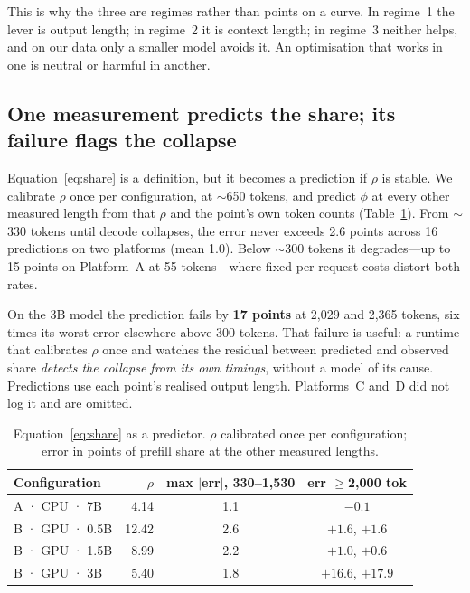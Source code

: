 \documentclass[sigconf,nonacm,10pt]{acmart}
\begin{document}
This is why the three are regimes rather than points on a curve. In regime~1 the lever is output length; in
regime~2 it is context length; in regime~3 neither helps, and on our data only a smaller model avoids it. An
optimisation that works in one is neutral or harmful in another.

\subsection{One measurement predicts the share; its failure flags the collapse}
\label{sec:predict}

Equation~\ref{eq:share} is a definition, but it becomes a prediction if $\rho$ is stable. We calibrate $\rho$
once per configuration, at $\sim$650 tokens, and predict $\phi$ at every other measured length from that $\rho$
and the point's own token counts (Table~\ref{tab:predict}). From $\sim$330 tokens until decode collapses, the error
never exceeds 2.6 points across 16 predictions on two platforms (mean 1.0). Below $\sim$300 tokens it degrades---up to 15 points on
Platform~A at 55 tokens---where fixed per-request costs distort both rates.

On the 3B model the prediction fails by \textbf{17 points} at 2{,}029 and 2{,}365 tokens, six times its worst error
elsewhere above 300 tokens. That failure is useful: a runtime that calibrates $\rho$ once and watches the residual between
predicted and observed share \emph{detects the collapse from its own timings}, without a model of its cause.
Predictions use each point's realised output length. Platforms~C and~D did not log it and are omitted.

\begin{table}[t]
\caption{Equation~\ref{eq:share} as a predictor. $\rho$ calibrated once per configuration; error in points of
prefill share at the other measured lengths.}
\label{tab:predict}
\footnotesize
\setlength{\tabcolsep}{4pt}
\begin{tabular}{@{}lrcc@{}}
\toprule
\textbf{Configuration} & $\rho$ & \textbf{max $|$err$|$, 330--1{,}530} & \textbf{err $\geq$2{,}000 tok} \\
\midrule
A · CPU · 7B      &  4.14 & 1.1 & $-0.1$ \\
B · GPU · 0.5B    & 12.42 & 2.6 & $+1.6$, $+1.6$ \\
B · GPU · 1.5B    &  8.99 & 2.2 & $+1.0$, $+0.6$ \\
B · GPU · 3B      &  5.40 & 1.8 & $\mathbf{+16.6}$, $\mathbf{+17.9}$ \\
\bottomrule
\end{tabular}
\end{table}
\end{document}

